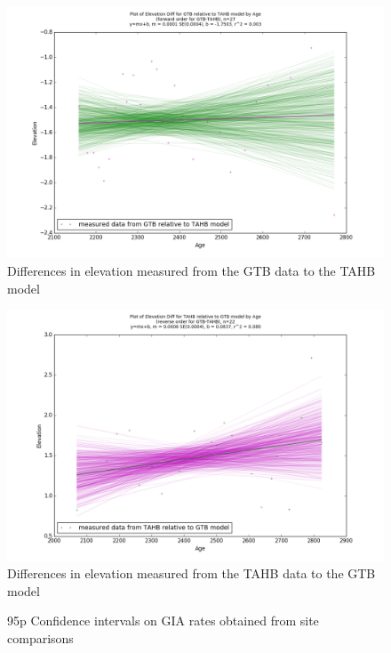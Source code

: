 \newpage

\begin{figure}[H]
	\includegraphics[width=0.9\linewidth]{data/bothNonZero/withinSeventyFivePercent/gias/theGIA_GTB_relative_to_TAHB.png}
	\caption{Differences in elevation measured from the GTB data to the TAHB model}
	\label{fig:gias_GTBxTAHB}
\end{figure}
\newpage


\begin{figure}[H]
	\includegraphics[width=0.9\linewidth]{data/bothNonZero/withinSeventyFivePercent/gias/theGIA_TAHB_relative_to_GTB.png}
	\caption{Differences in elevation measured from the TAHB data to the GTB model}
	\label{fig:gias_TAHBxGTB}
\end{figure}
\newpage


\begin{figure}[H]
	\caption{95p Confidence intervals on GIA rates obtained from site comparisons}
	\label{fig:intervalsGIA}
\end{figure}


\newpage

